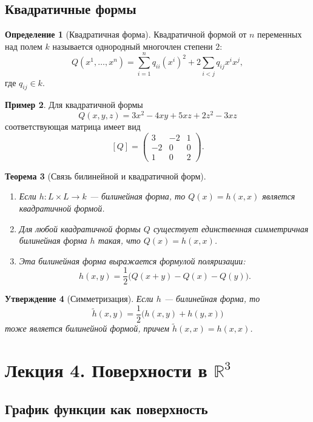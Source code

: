 \documentclass[12pt,a4paper]{article}
\newtheorem{theorem}{Теорема}[section]
\newtheorem{proposition}[theorem]{Утверждение}
\theoremstyle{definition}
\newtheorem{definition}[theorem]{Определение}
\newtheorem{example}[theorem]{Пример}
\begin{document}
\subsection{Квадратичные формы}

\begin{definition}[Квадратичная форма]
Квадратичной формой от $n$ переменных над полем $k$ называется однородный многочлен степени $2$:
$$Q(x^1, \dots, x^n) = \sum_{i=1}^n q_{ii}(x^i)^2 + 2\sum_{i<j} q_{ij}x^i x^j,$$
где $q_{ij} \in k$.
\end{definition}

\begin{example}
Для квадратичной формы
$$Q(x, y, z) = 3x^2 - 4xy + 5xz + 2z^2 - 3xz$$
соответствующая матрица имеет вид
$$[Q] = \begin{pmatrix} 3 & -2 & 1 \\ -2 & 0 & 0 \\ 1 & 0 & 2 \end{pmatrix}.$$
\end{example}

\begin{theorem}[Связь билинейной и квадратичной форм]
\begin{enumerate}
    \item Если $h: L \times L \to k$ --- билинейная форма, то $Q(x) = h(x, x)$ является квадратичной формой.
    \item Для любой квадратичной формы $Q$ существует единственная симметричная билинейная форма $h$ такая, что $Q(x) = h(x, x)$.
    \item Эта билинейная форма выражается формулой поляризации:
    $$h(x, y) = \frac{1}{2}\big(Q(x+y) - Q(x) - Q(y)\big).$$
\end{enumerate}
\end{theorem}

\begin{proposition}[Симметризация]
Если $h$ --- билинейная форма, то
$$\tilde{h}(x, y) = \frac{1}{2}\big(h(x, y) + h(y, x)\big)$$
тоже является билинейной формой, причем $\tilde{h}(x, x) = h(x, x)$.
\end{proposition}

\section{Лекция 4. Поверхности в \texorpdfstring{$\mathbb{R}^3$}{R3}}

\subsection{График функции как поверхность}
\end{document}
